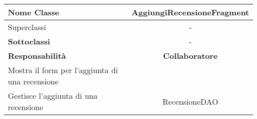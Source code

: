 
\setcounter{table}{0}
\begin{table}[H]
    \centering
    \begin{tabularx}{\textwidth}{||   X  ||  c   ||}
        \hline
        \rowcolor{Gray}
        \textbf{Nome Classe} & AggiungiRecensioneFragment\\
        \hline
        Superclassi  &  - \\
        \hline
        \textbf{Sottoclassi} & - \\
        \hline
        \hline
         \textbf{Responsabilità} & \textbf{Collaboratore} \\
         \hline
          Mostra il form per l'aggiunta di una recensione &  \\
          \hline
          Gestisce l'aggiunta di una recensione & RecensioneDAO \\
         \hline
    \end{tabularx}
\end{table}
